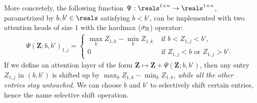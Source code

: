 \documentclass{article} %
\def\vone{{\bm{1}}}
\def\mZ{{\bm{Z}}}
\def\emZ{{Z}}
\DeclareMathOperator*{\argmax}{arg\,max}
\DeclareMathOperator*{\argmin}{arg\,min}
\newcommand{\hdmx}{\sigma_{\rm H}}
\begin{document}
More concretely, the following function $\Psi: \reals^{1 \times n} \to \reals^{1 \times n}$, parametrized by $b, b' \in \reals$ satisfying $b < b'$, can be implemented with two attention heads of size $1$ with the hardmax ($\hdmx$) operator:
\begin{align*}
    \Psi(\mZ; b, b')_{1, j} =
    \begin{cases}
        \max_k \emZ_{1,k} - \min_k \emZ_{1,k} & \text{ if } b < \emZ_{1,j} < b', \\
        0 & \text{ if } \emZ_{1,j} < b \text{ or } \emZ_{1,j} > b'.
    \end{cases}
\end{align*}
If we define an attention layer of the form $\mZ \mapsto \mZ + \Psi(\mZ;b,b')$, then any entry $\emZ_{1,j}$ in $(b,b')$ is shifted up by $\max_k \emZ_{1,k} - \min_k \emZ_{1,k}$, \emph{while all the other entries stay untouched}. We can choose $b$ and $b'$ to selectively shift certain entries, hence the name selective shift operation.
\end{document}

